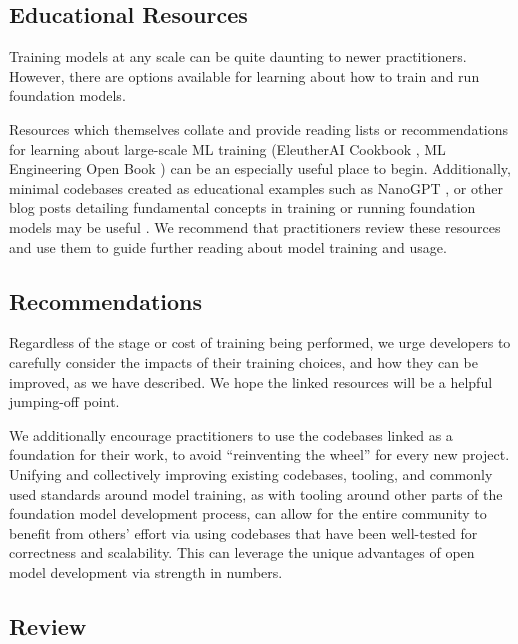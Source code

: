 \subsection{Educational Resources}

Training models at any scale can be quite daunting to newer practitioners. However, there are options available for learning about how to train and run foundation models.

Resources which themselves collate and provide reading lists or recommendations for learning about large-scale ML training (EleutherAI Cookbook \citep{anthony2024cookbook}, ML Engineering Open Book \citep{ml-engineering}) can be an especially useful place to begin. Additionally, minimal codebases created as educational examples such as NanoGPT \citep{nanogpt}, or other blog posts detailing fundamental concepts in training or running foundation models may be useful \citep{inference-arithmetic, transformer-math-eleutherai}. 
We recommend that practitioners review these resources and use them to guide further reading about model training and usage. 

\subsection{Recommendations}
\vspace{-2mm}


Regardless of the stage or cost of training being performed, we urge developers to carefully consider the impacts of their training choices, and how they can be improved, as we have described. We hope the linked resources will be a helpful jumping-off point.

We additionally encourage practitioners to use the codebases linked as a foundation for their work, to avoid ``reinventing the wheel'' for every new project. Unifying and collectively improving existing codebases, tooling, and commonly used standards around model training, as with tooling around other parts of the foundation model development process, can allow for the entire community to benefit from others' effort via using codebases that have been well-tested for correctness and scalability. This can leverage the unique advantages of open model development via strength in numbers. 

\subsection{Review}
\vspace{-2mm}


